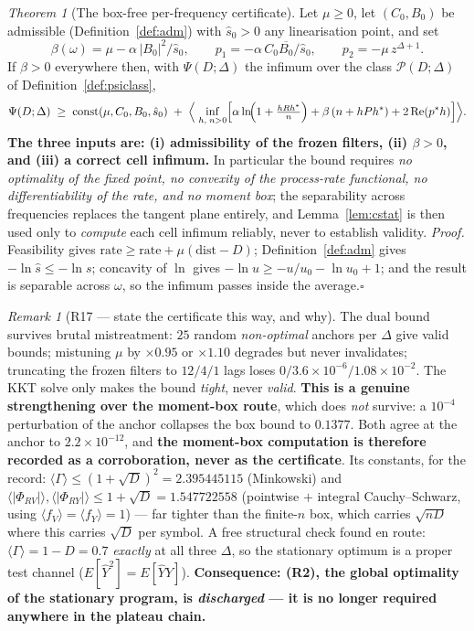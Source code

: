 \documentclass[11pt]{article}
\theoremstyle{definition}
\theoremstyle{remark}
\newtheorem{remark}{Remark}
\newtheorem{namedthm}{Theorem}
\begin{document}
\begin{namedthm}[The box-free per-frequency certificate]
\label{thm:cert}
Let $\mu\ge0$, let $(C_0,B_0)$ be admissible
(Definition~\ref{def:adm}) with $\hat s_0>0$ any linearisation point,
and set
\[
\beta(\omega)=\mu-\alpha\,|B_0|^2/\hat s_0 ,\qquad
p_1=-\alpha\,C_0\overline{B_0}/\hat s_0 ,\qquad
p_2=-\mu\,z^{\Delta+1}.
\]
If $\beta>0$ everywhere then, with $\Psi(D;\Delta)$ the infimum over the class
$\mathcal P(D;\Delta)$ of Definition~\ref{def:psiclass},
\[
\Psi(D;\Delta)\;\ge\;
\mathrm{const}(\mu,C_0,B_0,\hat s_0)\;+\;
\Bigl\langle\;\inf_{h,\;n>0}\Bigl[
\alpha\ln\!\Bigl(1+\tfrac{hRh^\ast}{n}\Bigr)
+\beta\,(n+hPh^\ast)+2\operatorname{Re}(p^\ast h)\Bigr]\Bigr\rangle .
\]
\textbf{The three inputs are: (i) admissibility of the frozen filters,
(ii) $\beta>0$, and (iii) a correct cell infimum.} In particular the
bound requires \emph{no optimality of the fixed point, no convexity of
the process-rate functional, no differentiability of the rate, and no
moment box}; the separability across frequencies replaces the tangent
plane entirely, and Lemma~\ref{lem:cstat} is then used only to
\emph{compute} each cell infimum reliably, never to establish validity.
\emph{Proof.} Feasibility gives $\mathrm{rate}\ge\mathrm{rate}
+\mu(\mathrm{dist}-D)$; Definition~\ref{def:adm} gives
$-\ln\hat s\le-\ln s$; concavity of $\ln$ gives
$-\ln u\ge-u/u_0-\ln u_0+1$; and the result is separable across
$\omega$, so the infimum passes inside the average.\hfill$\square$
\end{namedthm}

\begin{remark}[R17 --- state the certificate this way, and why]
\label{rem:R17}
The dual bound survives brutal mistreatment: $25$ random
\emph{non-optimal} anchors per $\Delta$ give valid bounds; mistuning
$\mu$ by $\times0.95$ or $\times1.10$ degrades but never invalidates;
truncating the frozen filters to $12/4/1$ lags loses
$0/3.6\times10^{-6}/1.08\times10^{-2}$. The KKT solve only makes the
bound \emph{tight}, never \emph{valid}. \textbf{This is a genuine
strengthening over the moment-box route}, which does \emph{not}
survive: a $10^{-4}$ perturbation of the anchor collapses the box bound
to $0.1377$. Both agree at the anchor to $2.2\times10^{-12}$, and
\textbf{the moment-box computation is therefore recorded as a
corroboration, never as the certificate}. Its constants, for the
record: $\langle\Gamma\rangle\le(1+\sqrt D)^2=2.395445115$ (Minkowski)
and $\langle|\Phi_{RV}|\rangle,\langle|\Phi_{RY}|\rangle\le1+\sqrt
D=1.547722558$ (pointwise $+$ integral Cauchy--Schwarz, using
$\langle f_V\rangle=\langle f_Y\rangle=1$) --- far tighter than the
finite-$n$ box, which carries $\sqrt{nD}$ where this carries $\sqrt D$
per symbol. A free structural check found en route:
$\langle\Gamma\rangle=1-D=0.7$ \emph{exactly} at all three $\Delta$, so
the stationary optimum is a proper test channel
($E[\hat Y^2]=E[\hat Y Y]$). \textbf{Consequence: (R2), the global
optimality of the stationary program, is \emph{discharged} --- it is no
longer required anywhere in the plateau chain.}
\end{remark}
\end{document}
